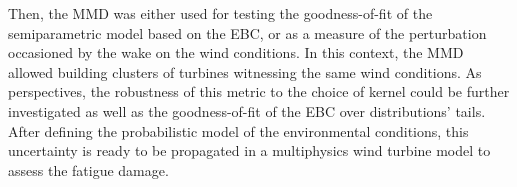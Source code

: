 Then, the MMD was either used for testing the goodness-of-fit of the semiparametric model based on the EBC, or as a measure of the perturbation occasioned by the wake on the wind conditions. 
In this context, the MMD allowed building clusters of turbines witnessing the same wind conditions. 
As perspectives, the robustness of this metric to the choice of kernel could be further investigated as well as the goodness-of-fit of the EBC over distributions' tails. 
After defining the probabilistic model of the environmental conditions, this uncertainty is ready to be propagated in a multiphysics wind turbine model to assess the fatigue damage. 
